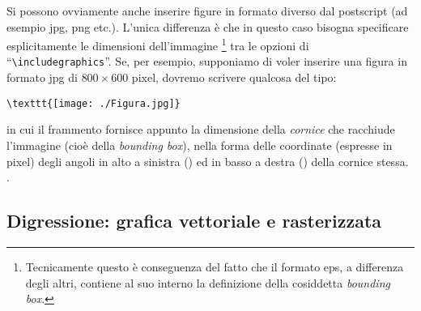 Si possono ovviamente anche inserire figure in formato diverso dal
postscript (ad esempio jpg, png etc.). L'unica differenza \`e che in questo
caso bisogna specificare esplicitamente le dimensioni dell'immagine%
\footnote{
Tecnicamente questo \`e conseguenza del fatto che il formato eps, a differenza
degli altri, contiene al suo interno la definizione della cosiddetta
\emph{bounding box}.
}
tra le opzioni di ``\verb|\includegraphics|''.
Se, per esempio, supponiamo di voler inserire una figura in formato jpg
di $800\times 600$ pixel, dovremo scrivere qualcosa del tipo:
\begin{verbatim}
\texttt{[image: ./Figura.jpg]}
\end{verbatim}
in cui il frammento 
fornisce appunto la dimensione della \emph{cornice} che racchiude l'immagine
(cio\`e della \emph{bounding box}), nella forma delle coordinate (espresse in
pixel) degli angoli in alto a sinistra () ed in basso a destra
() della cornice stessa.
.


\subsection{Digressione: grafica vettoriale e rasterizzata}
